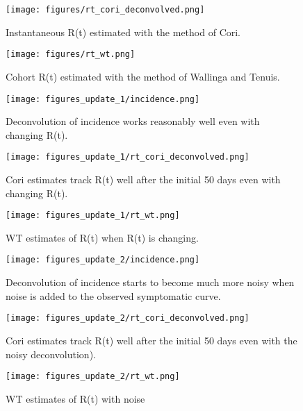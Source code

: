 \documentclass{article}
\begin{document}
\begin{figure}[h!]
    \centering
    \texttt{[image: figures/rt\_cori\_deconvolved.png]}
    \caption{Instantaneous R(t) estimated with the method of Cori.}
    \label{fig:my_label}
\end{figure}

\begin{figure}[h!]
    \centering
    \texttt{[image: figures/rt\_wt.png]}
    \caption{Cohort R(t) estimated with the method of Wallinga and Tenuis.}
    \label{fig:my_label}
\end{figure}

\begin{figure}[h!]
    \centering
    \texttt{[image: figures\_update\_1/incidence.png]}
    \caption{Deconvolution of incidence works reasonably well even with changing R(t).}
    \label{fig:my_label}
\end{figure}

\begin{figure}[h!]
    \centering
    \texttt{[image: figures\_update\_1/rt\_cori\_deconvolved.png]}
    \caption{Cori estimates track R(t) well after the initial 50 days even with changing R(t).}
    \label{fig:my_label}
\end{figure}

\begin{figure}[h!]
    \centering
    \texttt{[image: figures\_update\_1/rt\_wt.png]}
    \caption{WT estimates of R(t) when R(t) is changing.}
    \label{fig:my_label}
\end{figure}

\begin{figure}[h!]
    \centering
    \texttt{[image: figures\_update\_2/incidence.png]}
    \caption{Deconvolution of incidence starts to become much more noisy when noise is added to the observed symptomatic curve.}
    \label{fig:my_label}
\end{figure}

\begin{figure}[h!]
    \centering
    \texttt{[image: figures\_update\_2/rt\_cori\_deconvolved.png]}
    \caption{Cori estimates track R(t) well after the initial 50 days even with the noisy deconvolution).}
    \label{fig:my_label}
\end{figure}

\begin{figure}[h!]
    \centering
    \texttt{[image: figures\_update\_2/rt\_wt.png]}
    \caption{WT estimates of R(t) with noise}
    \label{fig:my_label}
\end{figure}
\end{document}
